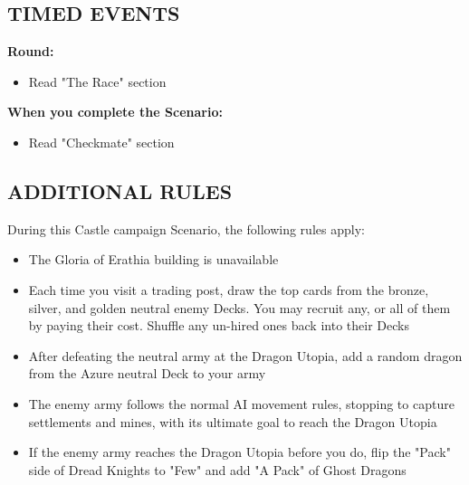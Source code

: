 \newpage

\begin{multicols}{2}

\subsection*{\MakeUppercase{Timed Events}}

\textbf{ Round:}
\begin{itemize}
  \item Read "The Race" section
\end{itemize}

\textbf{When you complete the Scenario:}
\begin{itemize}
  \item Read "Checkmate" section
\end{itemize}

\subsection*{\MakeUppercase{Additional rules}}

During this Castle campaign Scenario, the following rules apply:

\begin{itemize}
  \item The Gloria of Erathia building is unavailable
  \item Each time you visit a trading post, draw the top cards from the  bronze,  silver, and  golden neutral enemy Decks. You may recruit any, or all of them by paying their cost. Shuffle any un-hired ones back into their Decks
  \item After defeating the neutral army at the Dragon Utopia, add a random dragon from the  Azure neutral Deck to your army
  \item The enemy army follows the normal AI movement rules, stopping to capture settlements and mines, with its ultimate goal to reach the Dragon Utopia
  \item If the enemy army reaches the Dragon Utopia before you do, flip the "Pack" side of Dread Knights to "Few" and add "A Pack" of Ghost Dragons
\end{itemize}



\end{multicols}


